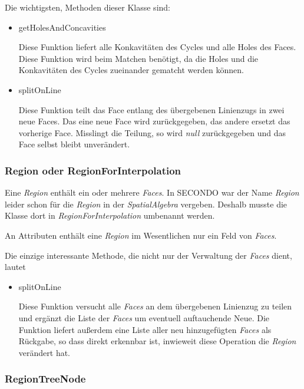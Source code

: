 Die wichtigsten, Methoden dieser Klasse sind:

\begin{itemize}

\item getHolesAndConcavities

Diese Funktion liefert alle Konkavitäten des Cycles und alle Holes des Faces. Diese Funktion wird beim Matchen benötigt, da die Holes und die Konkavitäten des Cycles zueinander gematcht werden können.

\item splitOnLine

Diese Funktion teilt das Face entlang des übergebenen Linienzugs in zwei neue Faces. Das eine neue Face wird zurückgegeben, das andere ersetzt das vorherige Face. Misslingt die Teilung, so wird \textit{null} zurückgegeben und das Face selbst bleibt unverändert.

\end{itemize}

\subsubsection{Region oder RegionForInterpolation}

Eine \textit{Region} enthält ein oder mehrere \textit{Faces}. In SECONDO war der Name \textit{Region} leider schon für die \textit{Region} in der \textit{SpatialAlgebra} vergeben. Deshalb musste die Klasse dort in \textit{RegionForInterpolation} umbenannt werden.

An Attributen enthält eine \textit{Region} im Wesentlichen nur ein Feld von \textit{Faces}.

Die einzige interessante Methode, die nicht nur der Verwaltung der \textit{Faces} dient, lautet 
\begin{itemize}
\item splitOnLine

Diese Funktion versucht alle \textit{Faces} an dem übergebenen Linienzug zu teilen und ergänzt die Liste der \textit{Faces} um eventuell auftauchende Neue. Die Funktion liefert außerdem eine Liste aller neu hinzugefügten \textit{Faces} als Rückgabe, so dass direkt erkennbar ist, inwieweit diese Operation die \textit{Region} verändert hat.

\end{itemize}

\subsubsection{RegionTreeNode}

